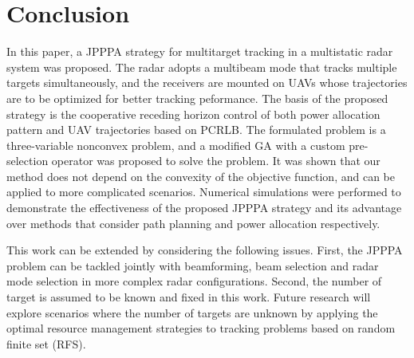 \documentclass[12pt,journal,draftclsnofoot,onecolumn]{IEEEtran}
\begin{document}
\section{Conclusion}

In this paper, a JPPPA strategy for multitarget tracking in a multistatic radar system was proposed. The radar adopts a multibeam mode that tracks multiple targets simultaneously, and the receivers are mounted on UAVs whose trajectories are to be optimized for better tracking peformance. The basis of the proposed strategy is the cooperative receding horizon control of both power allocation pattern and UAV trajectories based on PCRLB. The formulated problem is a three-variable nonconvex problem, and a modified GA with a custom pre-selection operator was proposed to solve the problem. It was shown that our method does not depend on the convexity of the objective function, and can be applied to more complicated scenarios. Numerical simulations were performed to demonstrate the effectiveness of the proposed JPPPA strategy and its advantage over methods that consider path planning and power allocation respectively. 

This work can be extended by considering the following issues. First, the JPPPA problem can be tackled jointly with beamforming, beam selection and radar mode selection in more complex radar configurations. Second, the number of target is assumed to be known and fixed in this work. Future research will explore scenarios where the number of targets are unknown by applying the optimal resource management strategies to tracking problems based on random finite set (RFS).



\end{document}

